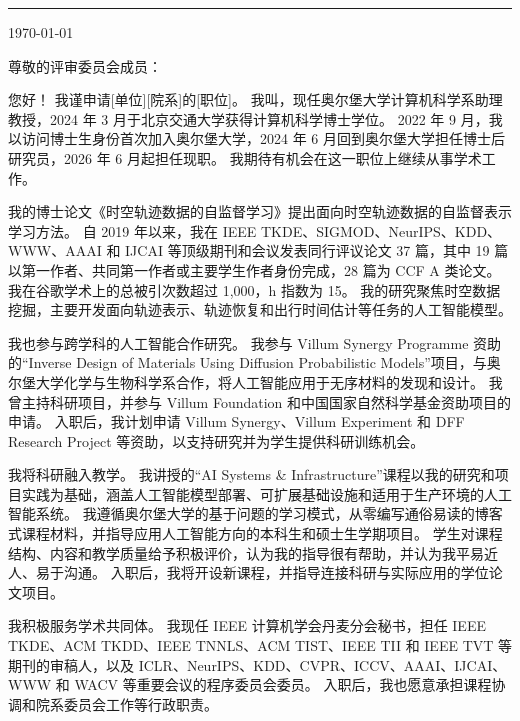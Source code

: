 \documentclass[a4paper]{article}
\begin{document}


{\color{rule}\rule{\linewidth}{0.4pt}}

\vspace{\entryskip}
\today

\vspace{\entryskip}
尊敬的评审委员会成员：

\vspace{\entryskip}
您好！
我谨申请[单位][院系]的[职位]。
我叫\mynamecn{}，现任奥尔堡大学计算机科学系助理教授，2024 年 3 月于北京交通大学获得计算机科学博士学位。
2022 年 9 月，我以访问博士生身份首次加入奥尔堡大学，2024 年 6 月回到奥尔堡大学担任博士后研究员，2026 年 6 月起担任现职。
我期待有机会在这一职位上继续从事学术工作。

\vspace{\entryskip}
我的博士论文《时空轨迹数据的自监督学习》提出面向时空轨迹数据的自监督表示学习方法。
自 2019 年以来，我在 IEEE TKDE、SIGMOD、NeurIPS、KDD、WWW、AAAI 和 IJCAI 等顶级期刊和会议发表同行评议论文 37 篇，其中 19 篇以第一作者、共同第一作者或主要学生作者身份完成，28 篇为 CCF A 类论文。
我在谷歌学术上的总被引次数超过 1,000，h 指数为 15。
我的研究聚焦时空数据挖掘，主要开发面向轨迹表示、轨迹恢复和出行时间估计等任务的人工智能模型。

\vspace{\entryskip}
我也参与跨学科的人工智能合作研究。
我参与 Villum Synergy Programme 资助的“Inverse Design of Materials Using Diffusion Probabilistic Models”项目，与奥尔堡大学化学与生物科学系合作，将人工智能应用于无序材料的发现和设计。
我曾主持科研项目，并参与 Villum Foundation 和中国国家自然科学基金资助项目的申请。
入职后，我计划申请 Villum Synergy、Villum Experiment 和 DFF Research Project 等资助，以支持研究并为学生提供科研训练机会。

\vspace{\entryskip}
我将科研融入教学。
我讲授的“AI Systems \& Infrastructure”课程以我的研究和项目实践为基础，涵盖人工智能模型部署、可扩展基础设施和适用于生产环境的人工智能系统。
我遵循奥尔堡大学的基于问题的学习模式，从零编写通俗易读的博客式课程材料，并指导应用人工智能方向的本科生和硕士生学期项目。
学生对课程结构、内容和教学质量给予积极评价，认为我的指导很有帮助，并认为我平易近人、易于沟通。
入职后，我将开设新课程，并指导连接科研与实际应用的学位论文项目。

\vspace{\entryskip}
我积极服务学术共同体。
我现任 IEEE 计算机学会丹麦分会秘书，担任 IEEE TKDE、ACM TKDD、IEEE TNNLS、ACM TIST、IEEE TII 和 IEEE TVT 等期刊的审稿人，以及 ICLR、NeurIPS、KDD、CVPR、ICCV、AAAI、IJCAI、WWW 和 WACV 等重要会议的程序委员会委员。
入职后，我也愿意承担课程协调和院系委员会工作等行政职责。
\end{document}

